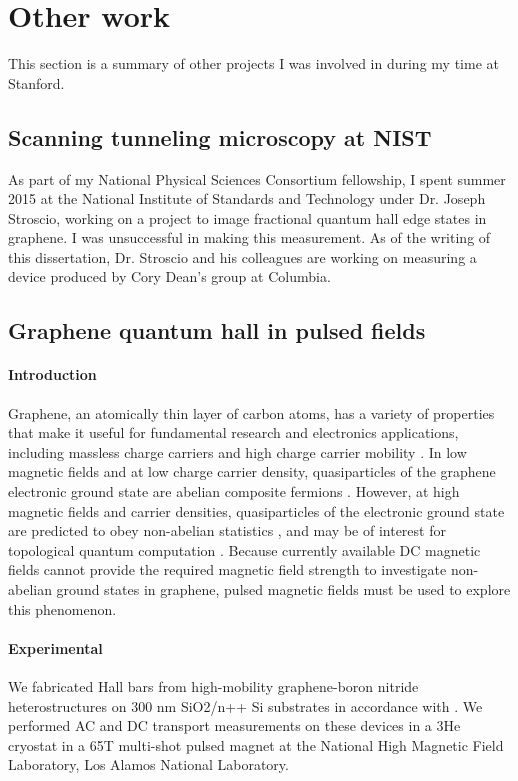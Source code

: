 \chapter{Other work}

This section is a summary of other projects I was involved in during my time at Stanford.

\section{Scanning tunneling microscopy at NIST}

As part of my National Physical Sciences Consortium fellowship, I spent summer 2015 at the National Institute of Standards and Technology under Dr. Joseph Stroscio, working on a project to image fractional quantum hall edge states in graphene. I was unsuccessful in making this measurement. As of the writing of this dissertation, Dr. Stroscio and his colleagues are working on measuring a device produced by Cory Dean's group at Columbia.

\section{Graphene quantum hall in pulsed fields}

\subsubsection{Introduction}
Graphene, an atomically thin layer of carbon atoms, has a variety of properties that make it useful for fundamental research and electronics applications, including massless charge carriers and high charge carrier mobility \cite{CastroNeto2009}. In low magnetic fields and at low charge carrier density, quasiparticles of the graphene electronic ground state are abelian composite fermions \cite{Jain1989}. However, at high magnetic fields and carrier densities, quasiparticles of the electronic ground state are predicted to obey non-abelian statistics \cite{Papic2011}, and may be of interest for topological quantum computation \cite{Nayak2008}. Because currently available DC magnetic fields cannot provide the required magnetic field strength to investigate non-abelian ground states in graphene, pulsed magnetic fields must be used to explore this phenomenon. 

\subsubsection{Experimental}
We fabricated Hall bars from high-mobility graphene-boron nitride heterostructures on 300 nm SiO2/n++ Si substrates in accordance with \cite{Lee2016}. We performed AC and DC transport measurements on these devices in a 3He cryostat in a 65T multi-shot pulsed magnet at the National High Magnetic Field Laboratory, Los Alamos National Laboratory. 

